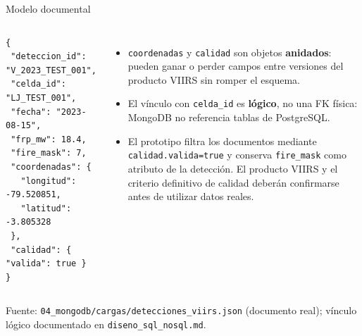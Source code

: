 \documentclass[aspectratio=169,11pt]{beamer}
\newcommand{\fuente}[1]{{\vfill\tiny\color{GrisTexto!70!black} Fuente: #1}}
\begin{document}
\begin{frame}[fragile]{Modelo documental}
  \begin{columns}[T]
      \begin{footnotesize}
      \begin{verbatim}
{
 "deteccion_id": "V_2023_TEST_001",
 "celda_id": "LJ_TEST_001",
 "fecha": "2023-08-15",
 "frp_mw": 18.4,
 "fire_mask": 7,
 "coordenadas": {
   "longitud": -79.520851,
   "latitud": -3.805328
 },
 "calidad": { "valida": true }
}
      \end{verbatim}
      \end{footnotesize}
      \begin{itemize}\small
        \item \texttt{coordenadas} y \texttt{calidad} son objetos \textbf{anidados}: pueden ganar o perder campos entre versiones del producto VIIRS sin romper el esquema.
        \item El v\'inculo con \texttt{celda\_id} es \textbf{l\'ogico}, no una FK f\'isica: MongoDB no referencia tablas de PostgreSQL.
        \item El prototipo filtra los documentos mediante \texttt{calidad.valida=true} y conserva \texttt{fire\_mask} como atributo de la detecci\'on. El producto VIIRS y el criterio definitivo de calidad deber\'an confirmarse antes de utilizar datos reales.
      \end{itemize}
  \end{columns}
  \fuente{\texttt{04\_mongodb/cargas/detecciones\_viirs.json} (documento real); v\'inculo l\'ogico documentado en \texttt{diseno\_sql\_nosql.md}.}
\end{frame}
\end{document}

